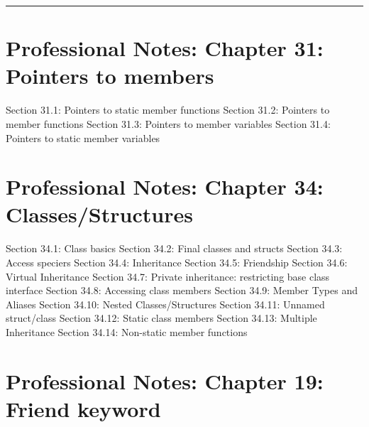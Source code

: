 \begin{center}\rule{0.5\linewidth}{0.5pt}\end{center}

\hypertarget{professional-notes-chapter-31-pointers-to-members}{%
\section{Professional Notes: Chapter 31: Pointers to
members}\label{professional-notes-chapter-31-pointers-to-members}}

Section 31.1: Pointers to static member functions Section 31.2: Pointers
to member functions Section 31.3: Pointers to member variables Section
31.4: Pointers to static member variables

\hypertarget{professional-notes-chapter-34-classesstructures}{%
\section{Professional Notes: Chapter 34:
Classes/Structures}\label{professional-notes-chapter-34-classesstructures}}

Section 34.1: Class basics Section 34.2: Final classes and structs
Section 34.3: Access speciers Section 34.4: Inheritance Section 34.5:
Friendship Section 34.6: Virtual Inheritance Section 34.7: Private
inheritance: restricting base class interface Section 34.8: Accessing
class members Section 34.9: Member Types and Aliases Section 34.10:
Nested Classes/Structures Section 34.11: Unnamed struct/class Section
34.12: Static class members Section 34.13: Multiple Inheritance Section
34.14: Non-static member functions

\hypertarget{professional-notes-chapter-19-friend-keyword}{%
\section{Professional Notes: Chapter 19: Friend
keyword}\label{professional-notes-chapter-19-friend-keyword}}

